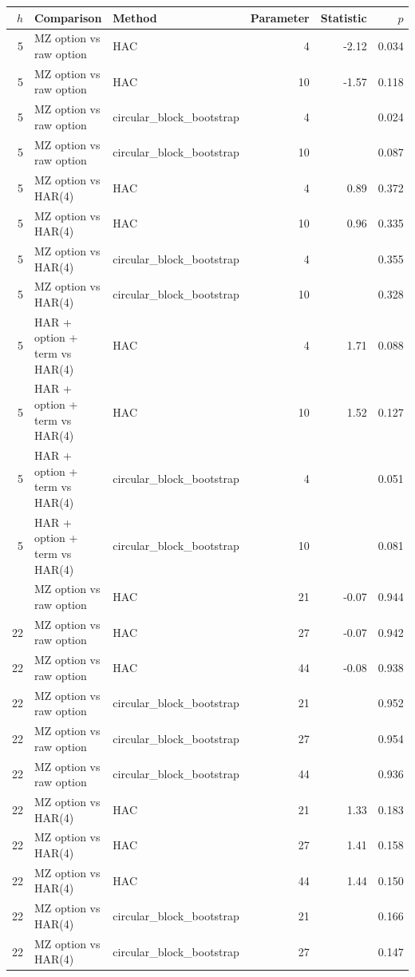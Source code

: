 \begin{tabular}{rllrrr}
\toprule
$h$ & Comparison & Method & Parameter & Statistic & $p$ \\
\midrule
5 & MZ option vs raw option & HAC & 4 & -2.12 & 0.034 \\
5 & MZ option vs raw option & HAC & 10 & -1.57 & 0.118 \\
5 & MZ option vs raw option & circular_block_bootstrap & 4 &  & 0.024 \\
5 & MZ option vs raw option & circular_block_bootstrap & 10 &  & 0.087 \\
5 & MZ option vs HAR(4) & HAC & 4 & 0.89 & 0.372 \\
5 & MZ option vs HAR(4) & HAC & 10 & 0.96 & 0.335 \\
5 & MZ option vs HAR(4) & circular_block_bootstrap & 4 &  & 0.355 \\
5 & MZ option vs HAR(4) & circular_block_bootstrap & 10 &  & 0.328 \\
5 & HAR + option + term vs HAR(4) & HAC & 4 & 1.71 & 0.088 \\
5 & HAR + option + term vs HAR(4) & HAC & 10 & 1.52 & 0.127 \\
5 & HAR + option + term vs HAR(4) & circular_block_bootstrap & 4 &  & 0.051 \\
5 & HAR + option + term vs HAR(4) & circular_block_bootstrap & 10 &  & 0.081 \\
\addlinespace
22 & MZ option vs raw option & HAC & 21 & -0.07 & 0.944 \\
22 & MZ option vs raw option & HAC & 27 & -0.07 & 0.942 \\
22 & MZ option vs raw option & HAC & 44 & -0.08 & 0.938 \\
22 & MZ option vs raw option & circular_block_bootstrap & 21 &  & 0.952 \\
22 & MZ option vs raw option & circular_block_bootstrap & 27 &  & 0.954 \\
22 & MZ option vs raw option & circular_block_bootstrap & 44 &  & 0.936 \\
22 & MZ option vs HAR(4) & HAC & 21 & 1.33 & 0.183 \\
22 & MZ option vs HAR(4) & HAC & 27 & 1.41 & 0.158 \\
22 & MZ option vs HAR(4) & HAC & 44 & 1.44 & 0.150 \\
22 & MZ option vs HAR(4) & circular_block_bootstrap & 21 &  & 0.166 \\
22 & MZ option vs HAR(4) & circular_block_bootstrap & 27 &  & 0.147 \\

\end{tabular}
